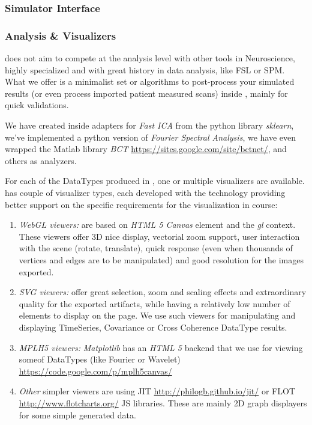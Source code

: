 	\subsubsection{Simulator Interface}
	
	\subsubsection{Analysis \& Visualizers}

\TVB does not aim to compete at the analysis level with other tools in Neuroscience, 
highly specialized and with great history in data analysis, like  FSL or SPM. 
What we offer is a minimalist set or algorithms to post-process your 
simulated results (or even process imported patient measured scans) inside \TVB, mainly for quick validations.

We have created inside \TVB adapters for \emph{Fast ICA} from the python library \emph{sklearn}, 
we've implemented a python version of \emph{Fourier Spectral Analysis}, 
we have even wrapped the Matlab library \emph{BCT} \url{https://sites.google.com/site/bctnet/}, and others as analyzers.

For each of the DataTypes produced in \TVB, one or multiple visualizers are available.	
\TVB has couple of  visualizer types, each developed with the technology providing better support on the specific requirements for the visualization in course:

\begin{enumerate}

	\item \emph{WebGL viewers:} are based on \emph{HTML 5 Canvas} element and the \emph{gl} context. 
	These viewers offer 3D nice display, vectorial zoom support, user interaction with the scene (rotate, translate), quick response 
	(even when thousands of vertices and edges are to be manipulated) and good resolution for the images exported.
	
	\item \emph{SVG viewers:} offer great selection, zoom and scaling effects and extraordinary quality for the exported artifacts, while having 
	a relatively low number of elements to display on the page. 
	We use such viewers for manipulating and displaying TimeSeries, Covariance or Cross Coherence DataType results.
	
	\item \emph{MPLH5 viewers:} \emph{Matplotlib} has an \emph{HTML 5} backend that we use for viewing someof \TVB DataTypes (like Fourier or Wavelet)
	\url{https://code.google.com/p/mplh5canvas/}
	
	\item \emph{Other} simpler viewers are using JIT \url{http://philogb.github.io/jit/} or FLOT \url{http://www.flotcharts.org/} JS libraries.
	These are mainly 2D graph displayers for some simple \TVB generated data.

\end{enumerate}

